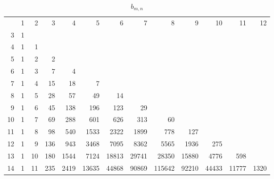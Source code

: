 \documentclass[10pt]{amsart}
\begin{document}
    \begin{table}[h]
    {\scriptsize \begin{tabular}{|r|rrrrrrrrrrrr|} \hline
    & 1 & 2 & 3 & 4 & 5 & 6 & 7 & 8 & 9 & 10 & 11 & 12 \\
    3 & 1 &&&&&&&&&&& \\
    4 & 1 & 1 &&&&&&&&&& \\
    5 & 1 & 2 & 2 &&&&&&&&& \\
    6 & 1 & 3 & 7 & 4 &&&&&&&& \\
    7 & 1 & 4 & 15 & 18 & 7 &&&&&&& \\
    8 & 1 & 5 & 28 & 57 & 49 & 14 &&&&&& \\
    9 & 1 & 6 & 45 & 138 & 196 & 123 & 29 &&&&& \\
    10 & 1 & 7 & 69 & 288 & 601 & 626 & 313 & 60 &&&& \\
    11 & 1 & 8 & 98 & 540 & 1533 & 2322 & 1899 & 778 & 127 &&& \\
    12 & 1 & 9 & 136 & 943 & 3468 & 7095 & 8362 & 5565 & 1936 & 275 && \\
    13 & 1 & 10 & 180 & 1544 & 7124 & 18813 & 29741 & 28350 & 15880 & 4776 & 598 & \\
    14 & 1 & 11 & 235 & 2419 & 13635 & 44868 & 90869 & 115642 & 92210 & 44433 & 11777 & 1320 \\ \hline
    \end{tabular}}
    \vspace{.2cm}
    \caption{$b_{m,n}$}
    \label{b-mn}
    \end{table}
    
\end{document}
